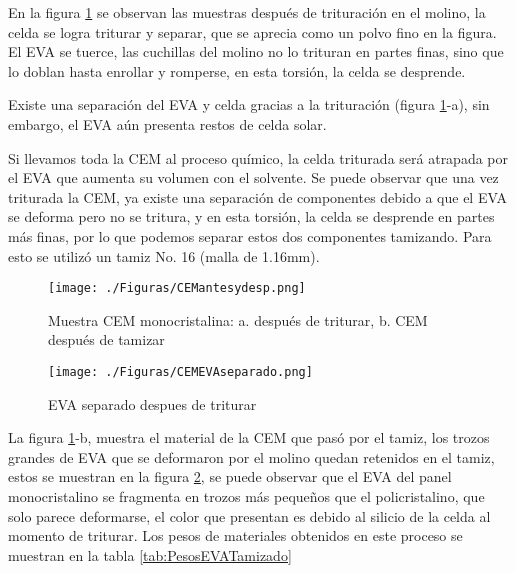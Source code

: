 En la figura \ref{fig:Muestratritu} se observan las muestras después de trituración en el molino, la celda se logra triturar y separar, que se aprecia como un polvo fino en la figura. El EVA se tuerce, las cuchillas del molino no lo trituran en partes finas, sino que lo doblan hasta enrollar y  romperse, en esta torsión, la celda se desprende.

Existe una separación del EVA y celda gracias a la trituración (figura \ref{fig:Muestratritu}-a), sin embargo, el EVA aún presenta restos de celda solar.

Si llevamos toda la CEM al proceso químico, la celda triturada será atrapada por el EVA que aumenta su volumen con el solvente. Se puede observar que una vez triturada la CEM, ya existe una separación de componentes debido a que el EVA se deforma pero no se tritura, y en esta torsión, la celda se desprende en partes más finas, por lo que podemos separar estos dos componentes tamizando. Para esto se utilizó un tamiz No. 16 (malla de 1.16mm). 
 
 \begin{figure}[htb]
 	\begin{center}
 		\texttt{[image: ./Figuras/CEMantesydesp.png]}
 	\end{center}
 	\vspace{-1em} %
 	\caption{Muestra CEM monocristalina: a. después de triturar, b. CEM después de tamizar}
 	\label{fig:Muestratritu}
 \end{figure}
  
 \begin{figure}[htb]
	\begin{center}
		\texttt{[image: ./Figuras/CEMEVAseparado.png]}
	\end{center}
	\vspace{-1em} %
	\caption{EVA separado despues de triturar}
	\label{fig:CEMEVAseparado}
\end{figure}


La figura \ref{fig:Muestratritu}-b, muestra el material de la CEM que pasó por el tamiz, los trozos grandes de EVA que se deformaron por el molino quedan retenidos en el tamiz, estos se muestran en la figura \ref{fig:CEMEVAseparado}, se puede observar que el EVA del panel monocristalino se fragmenta en trozos más pequeños que el policristalino, que solo parece deformarse, el color que presentan es debido al silicio de la celda al momento de triturar. Los pesos de materiales obtenidos en este proceso se muestran en la tabla \ref{tab:PesosEVATamizado}
 
